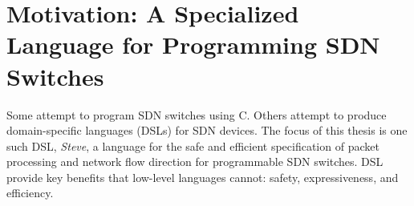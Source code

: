%
%
%
%
%

\section{Motivation: A Specialized Language for Programming SDN Switches}

Some attempt to program SDN switches using C.
Others attempt to produce domain-specific languages (DSLs) for SDN devices.
The focus of this thesis is one such DSL, \emph{Steve}, a language for the safe
and
efficient specification of packet processing and network flow direction
for programmable SDN switches. DSL provide key benefits that low-level
languages cannot: safety, expressiveness, and efficiency.

